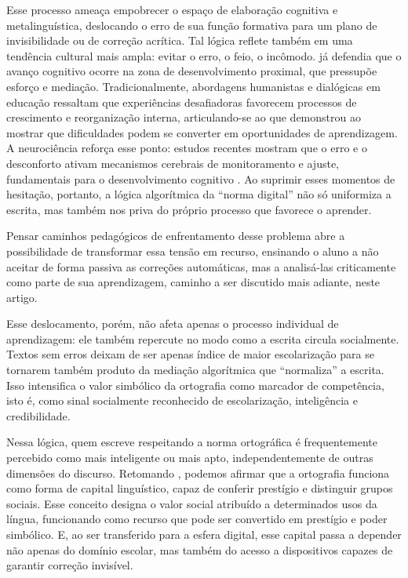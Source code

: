 \documentclass[portuguese]{textolivre}
\begin{document}
Esse processo ameaça empobrecer o espaço de elaboração cognitiva e metalinguística, deslocando o erro de sua função formativa para um plano de invisibilidade ou de correção acrítica. Tal lógica reflete também em uma tendência cultural mais ampla: evitar o erro, o feio, o incômodo. \textcite{vigotski1997formacao} já defendia que o avanço cognitivo ocorre na zona de desenvolvimento proximal, que pressupõe esforço e mediação. Tradicionalmente, abordagens humanistas e dialógicas em educação ressaltam que experiências desafiadoras favorecem processos de crescimento e reorganização interna, articulando-se ao que \textcite{dweck2017mindset} demonstrou ao mostrar que dificuldades podem se converter em oportunidades de aprendizagem. A neurociência reforça esse ponto: estudos recentes mostram que o erro e o desconforto ativam mecanismos cerebrais de monitoramento e ajuste, fundamentais para o desenvolvimento cognitivo \cite{kapur2016productive,ullsperger2014performancemonitoring}. Ao suprimir esses momentos de hesitação, portanto, a lógica algorítmica da “norma digital” não só uniformiza a escrita, mas também nos priva do próprio processo que favorece o aprender.

Pensar caminhos pedagógicos de enfrentamento desse problema abre a possibilidade de transformar essa tensão em recurso, ensinando o aluno a não aceitar de forma passiva as correções automáticas, mas a analisá-las criticamente como parte de sua aprendizagem, caminho a ser discutido mais adiante, neste artigo.

Esse deslocamento, porém, não afeta apenas o processo individual de aprendizagem: ele também repercute no modo como a escrita circula socialmente. Textos sem erros deixam de ser apenas índice de maior escolarização para se tornarem também produto da mediação algorítmica que “normaliza” a escrita. Isso intensifica o valor simbólico da ortografia como marcador de competência, isto é, como sinal socialmente reconhecido de escolarização, inteligência e credibilidade.

Nessa lógica, quem escreve respeitando a norma ortográfica é frequentemente percebido como mais inteligente ou mais apto, independentemente de outras dimensões do discurso. Retomando \textcite{bourdieu1991language}, podemos afirmar que a ortografia funciona como forma de capital linguístico, capaz de conferir prestígio e distinguir grupos sociais. Esse conceito designa o valor social atribuído a determinados usos da língua, funcionando como recurso que pode ser convertido em prestígio e poder simbólico. E, ao ser transferido para a esfera digital, esse capital passa a depender não apenas do domínio escolar, mas também do acesso a dispositivos capazes de garantir correção invisível.
\end{document}
